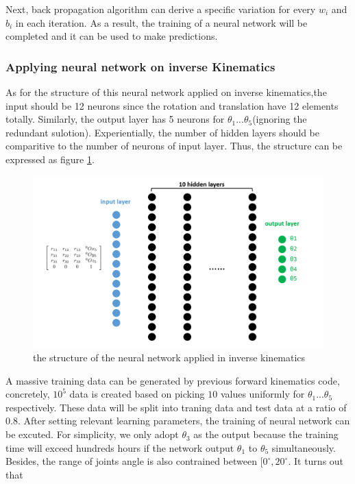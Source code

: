 \documentclass{article}
\begin{document}
Next, back propagation algorithm can derive a specific variation for every $w_i$ and $b_i$ in each iteration. As a result, the training of a neural network will be completed and it can be used to make predictions.  

\subsubsection{Applying neural network on inverse Kinematics}
As for the structure of this neural network applied on inverse kinematics,the input should be 12 neurons since the rotation and translation have 12 elements totally. Similarly, the output layer has 5 neurons for $\theta_1...\theta_5$(ignoring the redundant sulotion). Experientially, the number of hidden layers should be comparitive to the number of neurons of input layer. Thus, the structure can be expressed as figure \ref{fig:IK_neural_network}. 

\begin{figure}[htbp] 
\begin{center}
\includegraphics[width=\textwidth]{images/IK_neural_network}
\caption{the structure of the neural network applied in inverse kinematics}
\label{fig:IK_neural_network}
\end{center}
\end{figure}

A massive training data can be generated by previous forward kinematics code, concretely, $10^5$ data is created based on picking $10$ values uniformly for $\theta_1...\theta_5$ respectively. These data will be split into traning data and test data at a ratio of $0.8$.
After setting relevant learning parameters, the training of neural network can be excuted. For simplicity, we only adopt $\theta_3$ as the output because the training time will exceed hundreds hours if the network output $\theta_1$ to $\theta_5$ simultaneously. Besides, the range of joints angle is also contrained between $[0^{\circ},20^{\circ}$. 
It turns out that 
\end{document}
